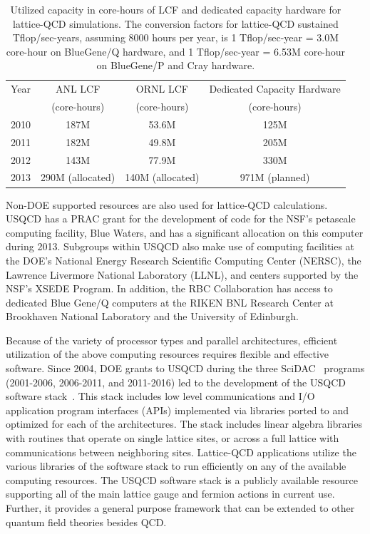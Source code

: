 \begin{table}[t]
\begin{center}
\caption{Utilized capacity in core-hours of LCF and dedicated capacity 
hardware for lattice-QCD simulations.   The conversion factors for lattice-QCD sustained
Tflop/sec-years, assuming 8000 hours per year, is 1 Tflop/sec-year = 3.0M core-hour on BlueGene/Q hardware, and 1 Tflop/sec-year = 6.53M core-hour on BlueGene/P and Cray hardware.\vspace{1.5mm}}
\label{tab:current}
\begin{tabular}{lccc}  
\hline\hline
Year & ANL LCF & ORNL LCF & Dedicated Capacity Hardware \\[-0.75mm]
& (core-hours) & (core-hours) & (core-hours) \\[0.5mm]  \hline
2010 & 187M & 53.6M & 125M \\
2011 & 182M & 49.8M & 205M \\
2012 & 143M & 77.9M & 330M \\
2013 & 290M (allocated) & 140M (allocated) & 971M (planned) \\ \hline\hline
\end{tabular}
\end{center}
\end{table}

Non-DOE supported resources are also used for lattice-QCD calculations.  USQCD
has a PRAC grant for the development of code for the NSF's petascale computing
facility, Blue Waters, and has a significant allocation on this
computer during 2013.  Subgroups within USQCD also make use of computing
facilities at the DOE's National Energy Research Scientific Computing Center
(NERSC), the Lawrence Livermore National Laboratory (LLNL), and centers
supported by the NSF's XSEDE Program.  In addition, the RBC Collaboration has
access to dedicated Blue Gene/Q computers at the RIKEN BNL Research Center at
Brookhaven National Laboratory and the University of Edinburgh.

Because of the variety of processor types and parallel architectures,
efficient utilization of the above computing resources requires flexible and
effective software.  Since 2004, DOE grants to USQCD during the three
SciDAC~\cite{SciDAC} programs (2001-2006, 2006-2011, and 2011-2016) led to the
development of the USQCD software stack~\cite{SciDAC-software}.  This stack
includes low level communications and I/O application program interfaces
(APIs) implemented via libraries ported to and optimized for each of the
architectures.  The stack includes linear algebra libraries with routines that
operate on single lattice sites, or across a full lattice with communications
between neighboring sites.  Lattice-QCD applications 
utilize the various libraries of the software stack to run efficiently on any
of the available computing resources.  The USQCD software stack is a publicly
available resource supporting all of the main lattice gauge and fermion
actions in current use.  Further, it provides a general purpose framework that
can be extended to other quantum field theories besides QCD.

